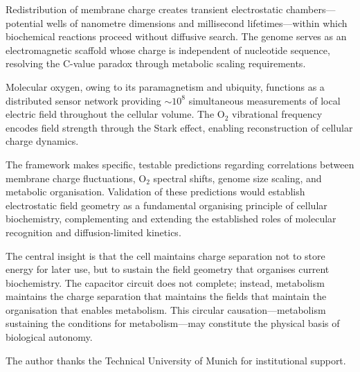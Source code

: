 \documentclass[twocolumn,10pt,aps,prd,superscriptaddress,floatfix,nofootinbib]{revtex4-2}
\theoremstyle{remark}
\begin{document}
Redistribution of membrane charge creates transient electrostatic chambers---potential wells of nanometre dimensions and millisecond lifetimes---within which biochemical reactions proceed without diffusive search. The genome serves as an electromagnetic scaffold whose charge is independent of nucleotide sequence, resolving the C-value paradox through metabolic scaling requirements.

Molecular oxygen, owing to its paramagnetism and ubiquity, functions as a distributed sensor network providing $\sim 10^8$ simultaneous measurements of local electric field throughout the cellular volume. The O$_2$ vibrational frequency encodes field strength through the Stark effect, enabling reconstruction of cellular charge dynamics.

The framework makes specific, testable predictions regarding correlations between membrane charge fluctuations, O$_2$ spectral shifts, genome size scaling, and metabolic organisation. Validation of these predictions would establish electrostatic field geometry as a fundamental organising principle of cellular biochemistry, complementing and extending the established roles of molecular recognition and diffusion-limited kinetics.

The central insight is that the cell maintains charge separation not to store energy for later use, but to sustain the field geometry that organises current biochemistry. The capacitor circuit does not complete; instead, metabolism maintains the charge separation that maintains the fields that maintain the organisation that enables metabolism. This circular causation---metabolism sustaining the conditions for metabolism---may constitute the physical basis of biological autonomy.

\begin{acknowledgments}
The author thanks the Technical University of Munich for institutional support.
\end{acknowledgments}


\end{document}

